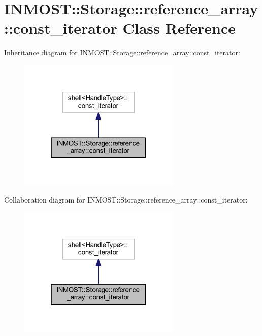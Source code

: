 \hypertarget{classINMOST_1_1Storage_1_1reference__array_1_1const__iterator}{\section{I\-N\-M\-O\-S\-T\-:\-:Storage\-:\-:reference\-\_\-array\-:\-:const\-\_\-iterator Class Reference}
\label{classINMOST_1_1Storage_1_1reference__array_1_1const__iterator}
}


Inheritance diagram for I\-N\-M\-O\-S\-T\-:\-:Storage\-:\-:reference\-\_\-array\-:\-:const\-\_\-iterator\-:\nopagebreak
\begin{figure}[H]
\begin{center}
\leavevmode
\includegraphics[width=219pt]{classINMOST_1_1Storage_1_1reference__array_1_1const__iterator__inherit__graph}
\end{center}
\end{figure}


Collaboration diagram for I\-N\-M\-O\-S\-T\-:\-:Storage\-:\-:reference\-\_\-array\-:\-:const\-\_\-iterator\-:\nopagebreak
\begin{figure}[H]
\begin{center}
\leavevmode
\includegraphics[width=219pt]{classINMOST_1_1Storage_1_1reference__array_1_1const__iterator__coll__graph}
\end{center}
\end{figure}
